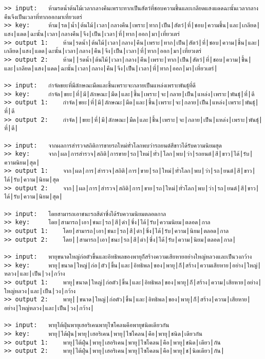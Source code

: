 \documentclass[11pt]{article}
\begin{document}
\begin{Verbatim}[commandchars=\\\{\}]
>> input:	ห้ามรดน้ำต้นไม้เวลากลางคืนเพราะทากเป็นสัตว์ที่ชอบความชื้นและเกลียดแสงแดดฉะนั้นเวลากลางคืนจึงเป็นเวลาที่ทากออกมาเที่ยวเตร่
>> key:		ห้าม|รด|น้ำ|ต้นไม้|เวลา|กลางคืน|เพราะ|ทาก|เป็น|สัตว์|ที่|ชอบ|ความชื้น|และ|เกลียด|แสง|แดด|ฉะนั้น|เวลา|กลางคืน|จึง|เป็น|เวลา|ที่|ทาก|ออก|มา|เที่ยวเตร่
>> output 1:	ห้าม|รดน้ำ|ต้นไม้|เวลา|กลาง|คืน|เพราะ|ทาก|เป็น|สัตว์|ที่|ชอบ|ความ|ชื้น|และ|เกลียด|แสง|แดด|ฉะนั้น|เวลา|กลาง|คืน|จึง|เป็น|เวลา|ที่|ทาก|ออก|มา|เที่ยวเตร่
>> output 2:	ห้าม||รดน้ำ|ต้นไม้|เวลา|กลาง|คืน|เพราะ|ทาก|เป็น|สัตว์|ที่|ชอบ|ความ|ชื้น|และ|เกลียด|แสง|แดด|ฉะนั้น|เวลา|กลาง|คืน|จึง|เป็น|เวลา|ที่|ทาก|ออก|มา|เที่ยวเตร่|

>> input:	กำจัดขยะที่มีลักษณะมืดและชื้นเพราะจะกลายเป็นแหล่งเพราะพันธุ์ที่ดี
>> key:		กำจัด|ขยะ|ที่|มี|ลักษณะ|มืด|และ|ชื้น|เพราะ|จะ|กลาย|เป็น|แหล่ง|เพราะ|พันธุ์|ที่|ดี
>> output 1:	กำจัด|ขยะ|ที่|มี|ลักษณะ|มืด|และ|ชื้น|เพราะ|จะ|กลาย|เป็น|แหล่ง|เพราะ|พันธุ์|ที่|ดี
>> output 2:	กำจัด||ขยะ|ที่|มี|ลักษณะ|มืด|และ|ชื้น|เพราะ|จะ|กลาย|เป็น|แหล่ง|เพราะ|พันธุ์|ที่|ดี|

>> input:	จากผลการสำรวจสถิติการขายรถใหม่ทั่วโลกพบว่ารถยนต์สีขาวได้รับความนิยมสุด
>> key:		จาก|ผล|การสำรวจ|สถิติ|การขาย|รถ|ใหม่|ทั่ว|โลก|พบ|ว่า|รถยนต์|สี|ขาว|ได้|รับ|ความนิยม|สุด|
>> output 1:	จาก|ผล|การ|สำรวจ|สถิติ|การ|ขาย|รถ|ใหม่|ทั่วโลก|พบ|ว่า|รถ|ยนต์|สี|ขาว|ได้|รับ|ความ|นิยม|สุด
>> output 2:	จาก||ผล|การ|สำรวจ|สถิติ|การ|ขาย|รถ|ใหม่|ทั่วโลก|พบ|ว่า|รถ|ยนต์|สี|ขาว|ได้|รับ|ความ|นิยม|สุด|

>> input:	โดยสามารถเอาชนะรถสีดำซึ่งได้รับความนิยมตลอดกาล
>> key:		โดย|สามารถ|เอา|ชนะ|รถ|สี|ดำ|ซึ่ง|ได้|รับ|ความนิยม|ตลอด|กาล
>> output 1:	โดย|สามารถ|เอา|ชนะ|รถ|สี|ดำ|ซึ่ง|ได้|รับ|ความ|นิยม|ตลอด|กาล
>> output 2:	โดย||สามารถ|เอา|ชนะ|รถ|สี|ดำ|ซึ่ง|ได้|รับ|ความ|นิยม|ตลอด|กาล|

>> input:	พายุขนาดใหญ่ก่อตัวขึ้นและอิทธิพลของพายุก็สร้างความเสียหายอย่างใหญ่หลวงและเป็นวงกว้าง
>> key:		พายุ|ขนาด|ใหญ่|ก่อ|ตัว|ขึ้น|และ|อิทธิพล|ของ|พายุ|ก็|สร้าง|ความเสียหาย|อย่าง|ใหญ่|หลวง|และ|เป็น|วง|กว้าง
>> output 1:	พายุ|ขนาด|ใหญ่|ก่อตัว|ขึ้น|และ|อิทธิพล|ของ|พายุ|ก็|สร้าง|ความ|เสียหาย|อย่าง|ใหญ่หลวง|และ|เป็น|วง|กว้าง
>> output 2:	พายุ||ขนาด|ใหญ่|ก่อตัว|ขึ้น|และ|อิทธิพล|ของ|พายุ|ก็|สร้าง|ความ|เสียหาย|อย่าง|ใหญ่หลวง|และ|เป็น|วง|กว้าง|

>> input:	พายุไต้ฝุ่นพายุเฮอริเคนพายุไซโคลนคือพายุชนิดเดียวกัน
>> key:		พายุ|ไต้ฝุ่น|พายุ|เฮอริเคน|พายุ|ไซโคลน|คือ|พายุ|ชนิด|เดียวกัน
>> output 1:	พายุ|ไต้ฝุ่น|พายุ|เฮอริเคน|พายุ|ไซโคลน|คือ|พายุ|ชนิด|เดียว|กัน
>> output 2:	พายุ|ไต้ฝุ่น|พายุ|เฮอริเคน|พายุ|ไซโคลน|คือ|พายุ|ช|นิดเดียว|กัน|


\end{Verbatim}
\end{document}
